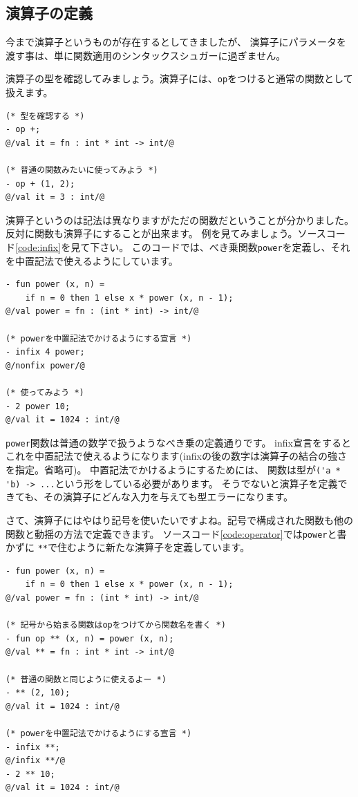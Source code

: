 \documentclass[11pt,a4paper]{article}
\begin{document}
\subsection{演算子の定義}
今まで演算子というものが存在するとしてきましたが、
演算子にパラメータを渡す事は、単に関数適用のシンタックスシュガーに過ぎません。

演算子の型を確認してみましょう。演算子には、\lstinline{op}をつけると通常の関数として扱えます。
\begin{lstlisting}[caption=演算子を評価する]
(* 型を確認する *)
- op +;
@/val it = fn : int * int -> int/@

(* 普通の関数みたいに使ってみよう *)
- op + (1, 2);
@/val it = 3 : int/@
\end{lstlisting}

演算子というのは記法は異なりますがただの関数だということが分かりました。
反対に関数も演算子にすることが出来ます。
例を見てみましょう。ソースコード\ref{code:infix}を見て下さい。
このコードでは、べき乗関数\lstinline{power}を定義し、それを中置記法で使えるようにしています。

\begin{lstlisting}[caption=演算子の定義,label=code:infix]
- fun power (x, n) =
    if n = 0 then 1 else x * power (x, n - 1);
@/val power = fn : (int * int) -> int/@

(* powerを中置記法でかけるようにする宣言 *)
- infix 4 power;
@/nonfix power/@

(* 使ってみよう *)
- 2 power 10;
@/val it = 1024 : int/@
\end{lstlisting}

\lstinline{power}関数は普通の数学で扱うようなべき乗の定義通りです。
infix宣言をするとこれを中置記法で使えるようになります(infixの後の数字は演算子の結合の強さを指定。省略可)。
中置記法でかけるようにするためには、
関数は型が\lstinline{('a * 'b) -> ...}という形をしている必要があります。
そうでないと演算子を定義できても、その演算子にどんな入力を与えても型エラーになります。

さて、演算子にはやはり記号を使いたいですよね。記号で構成された関数も他の関数と動揺の方法で定義できます。
ソースコード\ref{code:operator}では\lstinline{power}と書かずに
\lstinline{**}で住むように新たな演算子を定義しています。

\begin{lstlisting}[caption=演算子の定義,label=code:operator]
- fun power (x, n) =
    if n = 0 then 1 else x * power (x, n - 1);
@/val power = fn : (int * int) -> int/@

(* 記号から始まる関数はopをつけてから関数名を書く *)
- fun op ** (x, n) = power (x, n);
@/val ** = fn : int * int -> int/@

(* 普通の関数と同じように使えるよー *)
- ** (2, 10);
@/val it = 1024 : int/@

(* powerを中置記法でかけるようにする宣言 *)
- infix **;
@/infix **/@
- 2 ** 10;
@/val it = 1024 : int/@
\end{lstlisting}
\end{document}
